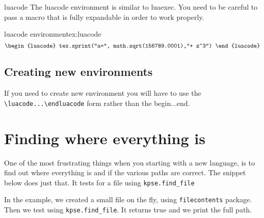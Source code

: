 \begin{docEnvironment}{luacode}{}
The luacode environment is similar to luaexec. You need to be careful to pass a macro that is fully expandable in order to work properly.
\end{docEnvironment}

\begin{texexample}{luacode environment}{ex:luacode}
\edef\foo{156789.0001}
\[
 \begin{luacode}
    tex.sprint("a=", math.sqrt(\foo),"+ z^3")
 \end{luacode}
\]
\end{texexample}

\section{Creating new environments}
If you need to create new environment you will have to use the \lstinline!\luacode...\endluacode! form  rather than the begin...end.




\chapter{Finding where everything is}

One of the most frustrating things when you starting with a new language, is to find out where
everything is and if the various paths are correct. The snippet below does just that. It tests for a file using \lstinline!kpse.find_file!
\bigskip


In the example, we created a small file on the fly, using \lstinline!filecontents! package. Then we test using \lstinline!kpse.find_file!. It returns true and we print the full path.

